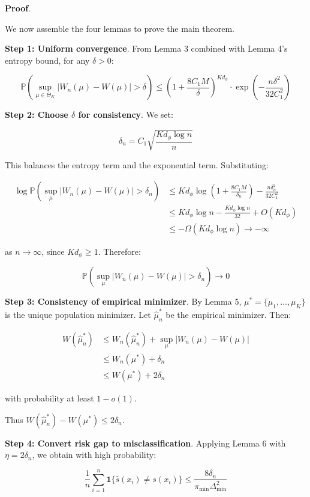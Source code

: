 \documentclass[
  12pt,
]{article}
\begin{document}
\textbf{Proof}.

We now assemble the four lemmas to prove the main theorem.

\textbf{Step 1: Uniform convergence}. From Lemma 3 combined with Lemma
4's entropy bound, for any \(\delta > 0\):

\[\mathbb{P}\left(\sup_{\mu \in \Theta_K} |W_n(\mu) - W(\mu)| > \delta\right) \leq \left(1 + \frac{8C_1 M}{\delta}\right)^{K d_\phi} \cdot \exp\left(-\frac{n\delta^2}{32 C_1^2}\right)\]

\textbf{Step 2: Choose \(\delta\) for consistency}. We set:

\[\delta_n = C_1 \sqrt{\frac{K d_\phi \log n}{n}}\]

This balances the entropy term and the exponential term. Substituting:

\[\begin{aligned}
\log \mathbb{P}\left(\sup_{\mu} |W_n(\mu) - W(\mu)| > \delta_n\right)
&\leq K d_\phi \log\left(1 + \frac{8C_1 M}{\delta_n}\right) - \frac{n\delta_n^2}{32 C_1^2} \\
&\leq K d_\phi \log n - \frac{K d_\phi \log n}{32} + O(K d_\phi) \\
&\leq -\Omega(K d_\phi \log n) \to -\infty
\end{aligned}\]

as \(n \to \infty\), since \(K d_\phi \geq 1\). Therefore:

\[\mathbb{P}\left(\sup_{\mu} |W_n(\mu) - W(\mu)| > \delta_n\right) \to 0\]

\textbf{Step 3: Consistency of empirical minimizer}. By Lemma 5,
\(\mu^* = \{\mu_1,\dots,\mu_K\}\) is the unique population minimizer.
Let \(\hat{\mu}_n^*\) be the empirical minimizer. Then:

\[\begin{aligned}
W(\hat{\mu}_n^*) &\leq W_n(\hat{\mu}_n^*) + \sup_{\mu} |W_n(\mu) - W(\mu)| \\
&\leq W_n(\mu^*) + \delta_n \\
&\leq W(\mu^*) + 2\delta_n
\end{aligned}\]

with probability at least \(1 - o(1)\).

Thus \(W(\hat{\mu}_n^*) - W(\mu^*) \leq 2\delta_n\).

\textbf{Step 4: Convert risk gap to misclassification}. Applying Lemma 6
with \(\eta = 2\delta_n\), we obtain with high probability:

\[\frac{1}{n} \sum_{i=1}^n \mathbf{1}\{\hat{s}(x_i) \neq s(x_i)\} \leq \frac{8\delta_n}{\pi_{\min} \Delta_{\min}^2}\]
\end{document}

